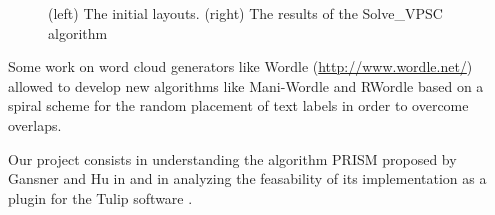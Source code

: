\documentclass[12pt]{report}
\begin{document}
\begin{figure}[h]
	\center
  \setlength\fboxsep{5pt}
  \setlength\fboxrule{0.5pt}
  \caption{(left) The initial layouts. (right) The results of the Solve\_VPSC algorithm}
  \label{vpsc}
\end{figure}

Some work on word cloud generators like Wordle (\url{http://www.wordle.net/}) allowed to develop new algorithms like Mani-Wordle \cite{Koh10} and RWordle \cite{SSSK12} based on a spiral scheme for the random placement of text labels in order to overcome overlaps.


\bigskip
Our project consists in understanding the algorithm PRISM proposed by Gansner and Hu in \cite{Gansner08} and in analyzing the feasability of its implementation as a plugin for the Tulip software \cite{Auber12}.
\end{document}
